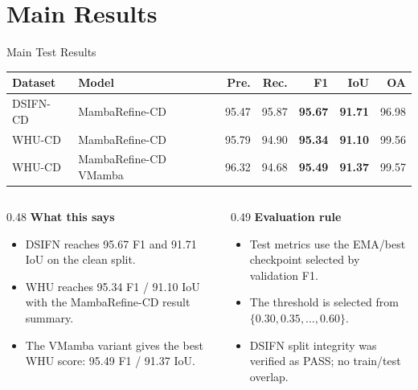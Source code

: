 \section{Main Results}

\begin{frame}{Main Test Results}
    \centering
    \scriptsize
    \begin{tabular}{llrrrrr}
        \toprule
        \textbf{Dataset} & \textbf{Model} & \textbf{Pre.} & \textbf{Rec.} & \textbf{F1} & \textbf{IoU} & \textbf{OA} \\
        \midrule
        DSIFN-CD & MambaRefine-CD & 95.47 & 95.87 & \textbf{95.67} & \textbf{91.71} & 96.98 \\
        WHU-CD & MambaRefine-CD & 95.79 & 94.90 & \textbf{95.34} & \textbf{91.10} & 99.56 \\
        WHU-CD & MambaRefine-CD VMamba & 96.32 & 94.68 & \textbf{95.49} & \textbf{91.37} & 99.57 \\
        \bottomrule
    \end{tabular}

    \vspace{0.8em}
    \begin{columns}[T,onlytextwidth]
        \begin{column}{0.48\textwidth}
            \small
            \textbf{What this says}
            \begin{itemize}
                \item DSIFN reaches 95.67 F1 and 91.71 IoU on the clean split.
                \item WHU reaches 95.34 F1 / 91.10 IoU with the MambaRefine-CD result summary.
                \item The VMamba variant gives the best WHU score: 95.49 F1 / 91.37 IoU.
            \end{itemize}
        \end{column}
        \begin{column}{0.49\textwidth}
            \small
            \textbf{Evaluation rule}
            \begin{itemize}
                \item Test metrics use the EMA/best checkpoint selected by validation F1.
                \item The threshold is selected from \(\{0.30,0.35,\ldots,0.60\}\).
                \item DSIFN split integrity was verified as PASS; no train/test overlap.
            \end{itemize}
        \end{column}
    \end{columns}
\end{frame}

